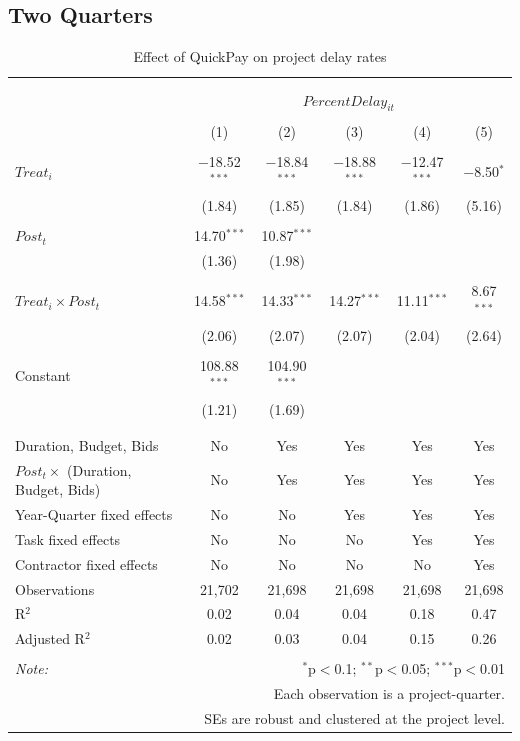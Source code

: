 \documentclass[
]{article}
\begin{document}
\hypertarget{two-quarters-1}{%
\subsection{Two Quarters}\label{two-quarters-1}}

\begin{table}[H] \centering 
  \caption{Effect of QuickPay on project delay rates} 
  \label{} 
\small 
\begin{tabular}{@{\extracolsep{-2pt}}lccccc} 
\\[-1.8ex]\hline 
\hline \\[-1.8ex] 
\\[-1.8ex] & \multicolumn{5}{c}{$PercentDelay_{it}$} \\ 
\\[-1.8ex] & (1) & (2) & (3) & (4) & (5)\\ 
\hline \\[-1.8ex] 
 $Treat_i$ & $-$18.52$^{***}$ & $-$18.84$^{***}$ & $-$18.88$^{***}$ & $-$12.47$^{***}$ & $-$8.50$^{*}$ \\ 
  & (1.84) & (1.85) & (1.84) & (1.86) & (5.16) \\ 
  & & & & & \\ 
 $Post_t$ & 14.70$^{***}$ & 10.87$^{***}$ &  &  &  \\ 
  & (1.36) & (1.98) &  &  &  \\ 
  & & & & & \\ 
 $Treat_i \times Post_t$ & 14.58$^{***}$ & 14.33$^{***}$ & 14.27$^{***}$ & 11.11$^{***}$ & 8.67$^{***}$ \\ 
  & (2.06) & (2.07) & (2.07) & (2.04) & (2.64) \\ 
  & & & & & \\ 
 Constant & 108.88$^{***}$ & 104.90$^{***}$ &  &  &  \\ 
  & (1.21) & (1.69) &  &  &  \\ 
  & & & & & \\ 
\hline \\[-1.8ex] 
Duration, Budget, Bids & No & Yes & Yes & Yes & Yes \\ 
$Post_t \times$  (Duration, Budget, Bids) & No & Yes & Yes & Yes & Yes \\ 
Year-Quarter fixed effects & No & No & Yes & Yes & Yes \\ 
Task fixed effects & No & No & No & Yes & Yes \\ 
Contractor fixed effects & No & No & No & No & Yes \\ 
Observations & 21,702 & 21,698 & 21,698 & 21,698 & 21,698 \\ 
R$^{2}$ & 0.02 & 0.04 & 0.04 & 0.18 & 0.47 \\ 
Adjusted R$^{2}$ & 0.02 & 0.03 & 0.04 & 0.15 & 0.26 \\ 
\hline 
\hline \\[-1.8ex] 
\textit{Note:}  & \multicolumn{5}{r}{$^{*}$p$<$0.1; $^{**}$p$<$0.05; $^{***}$p$<$0.01} \\ 
 & \multicolumn{5}{r}{Each observation is a project-quarter.} \\ 
 & \multicolumn{5}{r}{SEs are robust and clustered at the project level.} \\ 
\end{tabular} 
\end{table}
\end{document}
